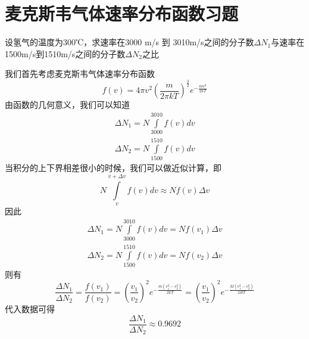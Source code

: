\documentclass[lang=cn,10pt]{elegantbook}
\begin{document}
	\section{麦克斯韦气体速率分布函数习题}
	\begin{example}
		设氢气的温度为300℃，求速率在3000 m/s 到 3010m/s之间的分子数$\varDelta N_{1}$与速率在1500m/s到1510m/s之间的分子数$\varDelta N_{2} $之比
	\end{example}
	\begin{solution}
		我们首先考虑麦克斯韦气体速率分布函数
		\begin{equation*}
			f\left( v \right) =4\pi v^2\left( \frac{m}{2\pi kT} \right) ^{\frac{3}{2}}e^{-\frac{mv^2}{2kT}}
		\end{equation*}
		由函数的几何意义，我们可以知道
		\begin{equation*}
			\begin{split}
				\varDelta N_{1}=N\int\limits_{3000}^{3010}{f\left( v \right) dv}
				\\
				\varDelta N_{2}=N\int\limits_{1500}^{1510}{f\left( v \right) dv}
			\end{split}
		\end{equation*}
		当积分的上下界相差很小的时候，我们可以做近似计算，即
		\begin{equation*}
			N\int\limits_v^{v+\varDelta v}{f\left( v \right) dv}\approx Nf\left( v \right) \varDelta v
		\end{equation*}
		因此
		\begin{equation*}
			\begin{split}
				\varDelta N_{1}=N\int\limits_{3000}^{3010}{f\left( v \right) dv}=Nf\left( v_{1} \right) \varDelta v
				\\
				\varDelta N_{2}=N\int\limits_{1500}^{1510}{f\left( v \right) dv}=Nf\left( v_{2} \right) \varDelta v
			\end{split}
		\end{equation*}
		则有
		\begin{equation*}
			\frac{\varDelta N_{1}}{\varDelta N_{2}}=\frac{f\left( v_{1} \right)}{f\left( v_{2} \right)}=\left( \frac{v_1}{v_2} \right) ^2e^{-\frac{m\left( v_{1}^{2}-v_{2}^{2} \right)}{2kT}}=\left( \frac{v_1}{v_2} \right) ^2e^{-\frac{M\left( v_{1}^{2}-v_{2}^{2} \right)}{2RT}}
		\end{equation*}
		代入数据可得
		\begin{equation*}
			\frac{\varDelta N_{1}}{\varDelta N_{2}}\approx0.9692
		\end{equation*}
	\end{solution}
		
\end{document}
